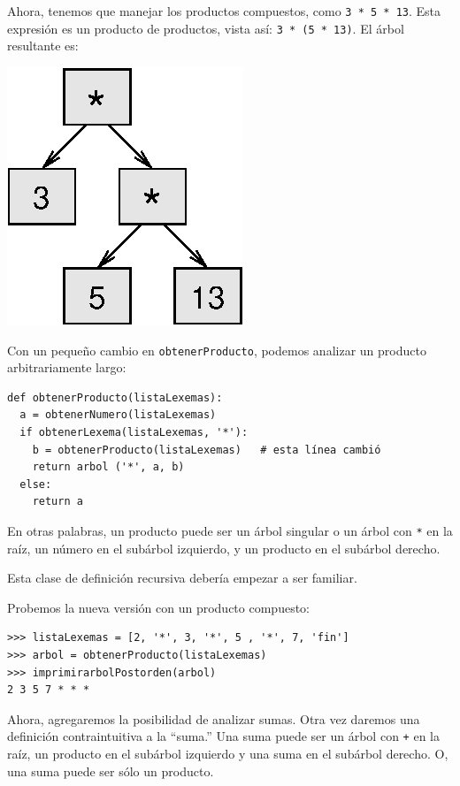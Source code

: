 Ahora, tenemos que manejar los productos compuestos, como \texttt{3
{*} 5 {*} 13}. Esta expresión es un producto de productos, vista así:
\texttt{3 {*} (5 {*} 13)}. El árbol resultante es:

\beforefig \centerline{\includegraphics{illustrations/tree4}}
\afterfig

Con un pequeño cambio en \texttt{obtenerProducto}, podemos analizar
un producto arbitrariamente largo:

\beforeverb 
\begin{verbatim}
def obtenerProducto(listaLexemas):
  a = obtenerNumero(listaLexemas)
  if obtenerLexema(listaLexemas, '*'):
    b = obtenerProducto(listaLexemas)   # esta línea cambió
    return arbol ('*', a, b)
  else:
    return a
\end{verbatim}
\afterverb En otras palabras, un producto puede ser un árbol singular
o un árbol con \texttt{{*}} en la raíz, un número en el subárbol izquierdo,
y un producto en el subárbol derecho.

Esta clase de definición recursiva debería empezar a ser familiar.

  

Probemos la nueva versión con un producto compuesto:

\beforeverb 
\begin{verbatim}
>>> listaLexemas = [2, '*', 3, '*', 5 , '*', 7, 'fin']
>>> arbol = obtenerProducto(listaLexemas)
>>> imprimirarbolPostorden(arbol)
2 3 5 7 * * *
\end{verbatim}
\afterverb Ahora, agregaremos la posibilidad de analizar sumas. Otra
vez daremos una definición contraintuitiva a la ``suma.'' Una suma
puede ser un árbol con \texttt{+} en la raíz, un producto en el subárbol
izquierdo y una suma en el subárbol derecho. O, una suma puede ser
sólo un producto.

